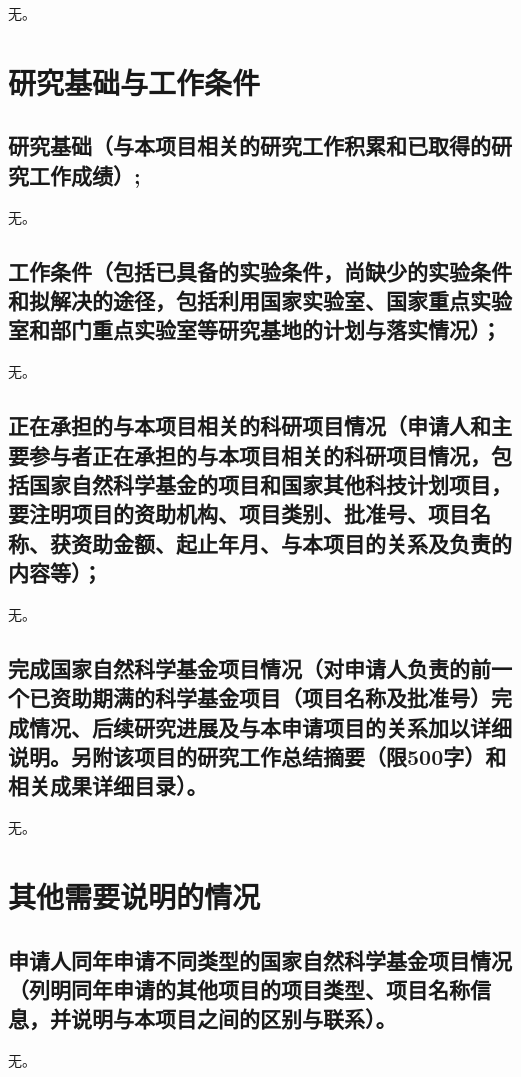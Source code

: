 \documentclass{nsfc}
\begin{document}
无。

\chapter{研究基础与工作条件}


\section{\textbf{研究基础}（与本项目相关的研究工作积累和已取得的研究工作成绩）;}

无。

\section{\textbf{工作条件}（包括已具备的实验条件，尚缺少的实验条件和拟解决的途径，包括利用国家实验室、国家重点实验室和部门重点实验室等研究基地的计划与落实情况）；}

无。

\section{\textbf{正在承担的与本项目相关的科研项目情况}（申请人和主要参与者正在承担的与本项目相关的科研项目情况，包括国家自然科学基金的项目和国家其他科技计划项目，要注明项目的资助机构、项目类别、批准号、项目名称、获资助金额、起止年月、与本项目的关系及负责的内容等）；}

无。

\section{\textbf{完成国家自然科学基金项目情况}（对申请人负责的前一个已资助期满的科学基金项目（项目名称及批准号）完成情况、后续研究进展及与本申请项目的关系加以详细说明。另附该项目的研究工作总结摘要（限500字）和相关成果详细目录）。}

无。

\chapter{其他需要说明的情况}

\section{申请人同年申请不同类型的国家自然科学基金项目情况（列明同年申请的其他项目的项目类型、项目名称信息，并说明与本项目之间的区别与联系）。}

无。
\end{document}
